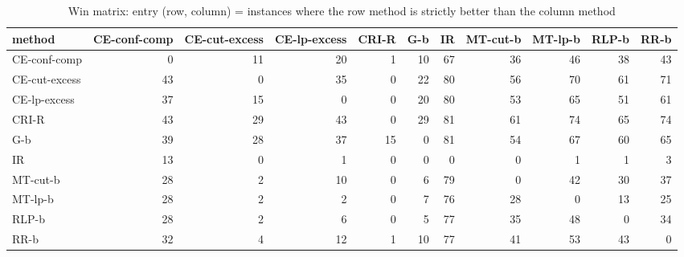 \begin{table}[htbp]
\centering
\small
\caption{Win matrix: entry (row, column) = instances where the row method is strictly better than the column method}
\label{tab:E2b_head_to_head_budgets_b10_wins}
\begin{tabular}{lrrrrrrrrrr}
\toprule
method & CE-conf-comp & CE-cut-excess & CE-lp-excess & CRI-R & G-b & IR & MT-cut-b & MT-lp-b & RLP-b & RR-b \\
\midrule
CE-conf-comp & 0 & 11 & 20 & 1 & 10 & 67 & 36 & 46 & 38 & 43 \\
CE-cut-excess & 43 & 0 & 35 & 0 & 22 & 80 & 56 & 70 & 61 & 71 \\
CE-lp-excess & 37 & 15 & 0 & 0 & 20 & 80 & 53 & 65 & 51 & 61 \\
CRI-R & 43 & 29 & 43 & 0 & 29 & 81 & 61 & 74 & 65 & 74 \\
G-b & 39 & 28 & 37 & 15 & 0 & 81 & 54 & 67 & 60 & 65 \\
IR & 13 & 0 & 1 & 0 & 0 & 0 & 0 & 1 & 1 & 3 \\
MT-cut-b & 28 & 2 & 10 & 0 & 6 & 79 & 0 & 42 & 30 & 37 \\
MT-lp-b & 28 & 2 & 2 & 0 & 7 & 76 & 28 & 0 & 13 & 25 \\
RLP-b & 28 & 2 & 6 & 0 & 5 & 77 & 35 & 48 & 0 & 34 \\
RR-b & 32 & 4 & 12 & 1 & 10 & 77 & 41 & 53 & 43 & 0 \\
\bottomrule
\end{tabular}
\end{table}
